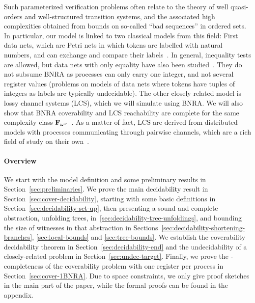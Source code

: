 Such parameterized verification problems often relate to the theory of well quasi-orders and well-structured transition systems, and the associated high complexities obtained from bounds on so-called ``bad sequences'' in ordered sets. In particular, our model is linked to two classical models from this field: First data nets, which are Petri nets in which tokens are labelled with natural numbers, and can exchange and compare their labels~\cite{LazicNORW08}. In general, inequality tests are allowed, but data nets with only equality have also been studied~\cite{Rosa-Velardo17}. They do not subsume BNRA as processes can only carry one integer, and not several register values (problems on models of data nets where tokens have tuples of integers as labels are typically undecidable).
The other closely related model is lossy channel systems (LCS)\cite{AbdullaJ1996undec}, which we will simulate using BNRA. We will also show that BNRA coverability and LCS reachability are complete for the same complexity class $\mathbf{F}_{\omega^\omega}$~\cite{ChambartS08ordinal, Schnoebelen2002verifying}.
As a matter of fact, LCS are derived from distributed models with processes communicating through pairwise channels, which are a rich field of study on their own~\cite{Aiswarya2015model,Aiswarya2020networks}.

\paragraph*{Overview}


We start with the model definition and some preliminary results in Section~\ref{sec:preliminaries}. We prove the main decidability result in Section~\ref{sec:cover-decidability}, starting with some basic definitions in Section~\ref{sec:decidability-set-up}, then presenting a sound and complete abstraction, unfolding trees, in~\ref{sec:decidability-tree-unfoldings}, and bounding the size of witnesses in that abstraction in Sections~\ref{sec:decidability-shortening-branches}, \ref{sec:local-bounds} and \ref{sec:tree-bounds}. We establish the coverability decidability theorem in Section~\ref{sec:decidability-end} and the undecidability of a closely-related problem in Section~\ref{sec:undec-target}. Finally, we prove the \NP-completeness of the coverability problem with one register per process in Section~\ref{sec:cover-1BNRA}.
Due to space constraints, we only give proof sketches in the main part of the paper, while the formal proofs can be found in the appendix.


